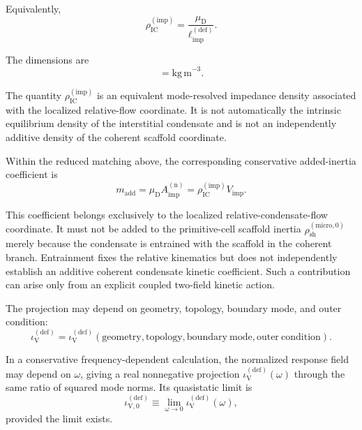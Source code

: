Equivalently,
\begin{equation}
    \rho_{\mathrm{IC}}^{(\mathrm{imp})}=\frac{\mu_{\mathrm{D}}}{\ell_{\mathrm{imp}}^{(\mathrm{def})}}.
\end{equation}

The dimensions are
\begin{equation}
    [\rho_{\mathrm{IC}}^{(\mathrm{imp})}]=\mathrm{kg\,m}^{-3}.
\end{equation}

The quantity $\rho_{\mathrm{IC}}^{(\mathrm{imp})}$ is an equivalent mode-resolved impedance density associated with the localized relative-flow coordinate. It is not automatically the intrinsic equilibrium density of the interstitial condensate and is not an independently additive density of the coherent scaffold coordinate.

Within the reduced matching above, the corresponding conservative added-inertia coefficient is
\begin{equation}
    m_{\mathrm{add}}=\mu_{\mathrm{D}}A_{\mathrm{imp}}^{(\mathrm{n})}=\rho_{\mathrm{IC}}^{(\mathrm{imp})}V_{\mathrm{imp}}.
\end{equation}

This coefficient belongs exclusively to the localized relative-condensate-flow coordinate. It must not be added to the primitive-cell scaffold inertia $\rho_{\mathrm{sh}}^{(\mathrm{micro},0)}$ merely because the condensate is entrained with the scaffold in the coherent branch. Entrainment fixes the relative kinematics but does not independently establish an additive coherent condensate kinetic coefficient. Such a contribution can arise only from an explicit coupled two-field kinetic action.

The projection may depend on geometry, topology, boundary mode, and outer condition:
\begin{equation}
    \iota_{\mathrm{V}}^{(\mathrm{def})}
    =
    \iota_{\mathrm{V}}^{(\mathrm{def})}
    \left(
    \mathrm{geometry},
    \mathrm{topology},
    \mathrm{boundary\ mode},
    \mathrm{outer\ condition}
    \right).
\end{equation}

In a conservative frequency-dependent calculation, the normalized response field may depend on $\omega$, giving a real nonnegative projection $\iota_{\mathrm{V}}^{(\mathrm{def})}(\omega)$ through the same ratio of squared mode norms. Its quasistatic limit is
\begin{equation}
    \iota_{\mathrm{V},0}^{(\mathrm{def})}\equiv\lim_{\omega\rightarrow0}\iota_{\mathrm{V}}^{(\mathrm{def})}(\omega),
\end{equation}
provided the limit exists.


